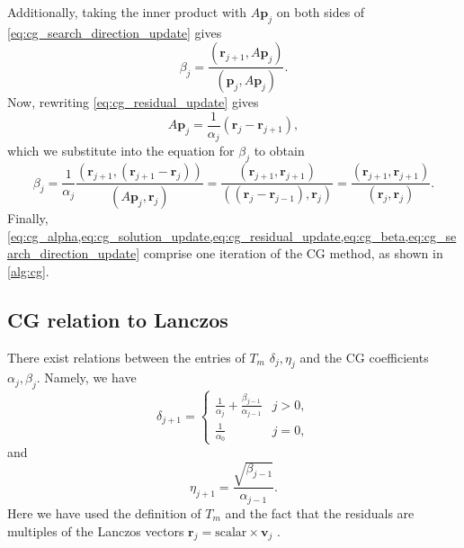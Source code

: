 Additionally, taking the inner product with $A \mathbf{p}_j$ on both sides of \cref{eq:cg_search_direction_update} gives
\[
  \beta_j = \frac{(\mathbf{r}_{j+1}, A \mathbf{p}_j)}{(\mathbf{p}_j, A \mathbf{p}_j)}.
\]
Now, rewriting \cref{eq:cg_residual_update} gives
\[
  A \mathbf{p}_j = \frac{1}{\alpha_j} (\mathbf{r}_j - \mathbf{r}_{j+1}),
\]
which we substitute into the equation for $\beta_j$ to obtain
\begin{equation}
  \beta_j = \frac{1}{\alpha_j}\frac{(\mathbf{r}_{j+1}, (\mathbf{r}_{j+1}-\mathbf{r}_j))}{(A \mathbf{p}_j, \mathbf{r}_j)} = \frac{(\mathbf{r}_{j+1},\mathbf{r}_{j+1})}{((\mathbf{r}_j - \mathbf{r}_{j-1}), \mathbf{r}_j)} = \frac{(\mathbf{r}_{j+1},\mathbf{r}_{j+1})}{(\mathbf{r}_j, \mathbf{r}_j)}.
  \label{eq:cg_beta}
\end{equation}
Finally, \cref{eq:cg_alpha,eq:cg_solution_update,eq:cg_residual_update,eq:cg_beta,eq:cg_search_direction_update} comprise one iteration of the CG method, as shown in \cref{alg:cg}.

\subsection{CG relation to Lanczos}
There exist relations between the entries of $T_m$ $\delta_j, \eta_j$ and the CG coefficients $\alpha_j, \beta_j$. Namely, we have
\begin{equation}
  \delta_{j+1} =
  \begin{cases}
    \frac{1}{\alpha_j} + \frac{\beta_{j-1}}{\alpha_{j-1}} & j > 0, \\
    \frac{1}{\alpha_0}                                    & j = 0,
  \end{cases}
  \label{eq:cg_lanczos_delta}
\end{equation}
and
\begin{equation}
  \eta_{j+1} = \frac{\sqrt{\beta_{j-1}}}{\alpha_{j-1}}.
  \label{eq:cg_lanczos_eta}
\end{equation}
Here we have used the definition of $T_m$ and the fact that the residuals are multiples of the Lanczos vectors $\mathbf{r}_j = \text{scalar} \times \mathbf{v}_j$ \cite[Equation 6.103]{iter_method_saad}.

